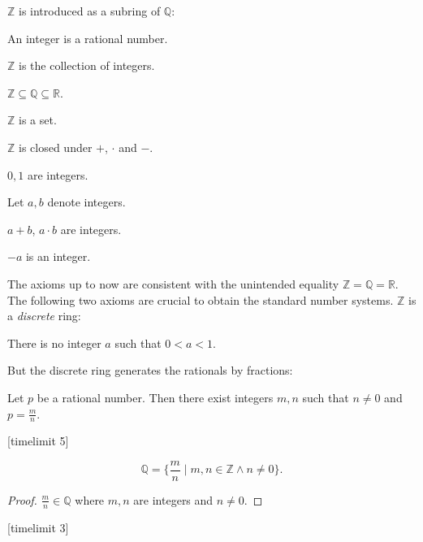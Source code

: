 \documentclass{article}
\begin{document}
$\mathbb{Z}$ is introduced as a subring of $\mathbb{Q}$:

\begin{forthel}

\begin{signature}
An integer is a rational number.
\end{signature}

\begin{definition}
$\mathbb{Z}$ is the collection of integers.
\end{definition}

\begin{lemma}
$\mathbb{Z} \subseteq \mathbb{Q} \subseteq \mathbb{R}$.
\end{lemma}

\begin{lemma}
$\mathbb{Z}$ is a set.
\end{lemma}
\end{forthel}
%
$\mathbb{Z}$ is closed under $+$, $\cdot$ and $-$.
%
\begin{forthel}
\begin{axiom}
$0,1$ are integers.
\end{axiom}

Let $a,b$ denote integers.

\begin{axiom}
$a + b$, $a \cdot b$ are integers.
\end{axiom}

\begin{axiom}
$-a$ is an integer.
\end{axiom}
\end{forthel}
%
The axioms up to now are consistent with the unintended
equality $\mathbb{Z} = \mathbb{Q} = \mathbb{R}$. The following
two axioms are crucial to obtain the standard number systems.
$\mathbb{Z}$ is a {\em discrete} ring:
%
\begin{forthel}
\begin{axiom}
There is no integer $a$ such that $0 < a < 1$.
\end{axiom}
\end{forthel}
%
But the discrete ring generates the rationals by fractions:
%
\begin{forthel}
\begin{axiom} Let $p$ be a rational number. Then
there exist integers $m, n$ such that
$n \neq 0$ and $p = \frac{m}{n}$.
\end{axiom}
[timelimit 5]
\begin{lemma}
$$\mathbb{Q} = 
\{\frac{m}{n} \mid m,n \in \mathbb{Z} \wedge n \neq 0\}.$$
\end{lemma}
\begin{proof}
$\frac{m}{n} \in \mathbb{Q}$ where $m,n$ are integers and
$n \neq 0$.
\end{proof}
[timelimit 3]
\end{forthel}
\end{document}
